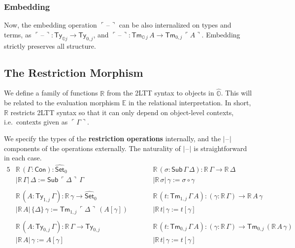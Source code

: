 \documentclass[acmsmall]{acmart}
\newcommand{\msf}[1]{\mathsf{#1}}
\newcommand{\mbb}[1]{\mathbb{#1}}
\newcommand{\wh}[1]{\widehat{#1}}
\newcommand{\mbbo}{\mbb{O}}
\newcommand{\Con}{\msf{Con}}
\newcommand{\Sub}{\msf{Sub}}
\newcommand{\Ty}{\msf{Ty}}
\newcommand{\Tm}{\msf{Tm}}
\newcommand{\Set}{\mathsf{Set}}
\newcommand{\blank}{{\mathord{\hspace{1pt}\text{--}\hspace{1pt}}}}
\newcommand{\emb}[1]{\ulcorner#1\urcorner}
\newcommand{\hato}{\bm\hat{\mbbo}}
\newcommand{\ev}{\mbb{E}}
\newcommand{\re}{\mbb{R}}
\theoremstyle{remark}
\newcommand{\whset}{\wh{\Set}}
\begin{document}
\subsubsection{Embedding}
Now, the embedding operation $\emb{\blank}$ can be also internalized on types
and terms, as $\emb{\blank} : \Ty_{\mbbo j} \to \Ty_{0,j}$, and $\emb{\blank}
:\Tm_{\mbbo\,j}\,A \to \Tm_{0,j}\,\emb{A}$. Embedding strictly preserves all structure.

\subsection{The Restriction Morphism}

We define a family of functions $\re$ from the 2LTT syntax to objects in
$\hato$. This will be related to the evaluation morphism $\ev$ in the relational
interpretation. In short, $\re$ restricts 2LTT syntax so that it can only depend
on object-level contexts, i.e.\ contexts given as $\emb{\Gamma}$.

\begin{definition} We specify the types of the \textbf{restriction operations} internally, and the $|\blank|$
components of the operations externally. The naturality of $|\blank|$ is
straightforward in each case.
\begingroup
\begin{alignat*}{5}
  & \re\,(\Gamma : \Con) : \whset_0 && \re\,(\sigma : \Sub\,\Gamma\,\Delta) : \re\,\Gamma \to \re\,\Delta \\
  & |\re\,\Gamma|\,\Delta := \Sub\,\emb{\Delta}\,\Gamma && |\re\,\sigma|\,\gamma := \sigma \circ \gamma \\
  & \\
  & \re\,(A : \Ty_{1,j}\,\Gamma) : \re\,\gamma \to \whset_0 && \re\,(t : \Tm_{1,j}\,\Gamma\,A) : (\gamma : \re\,\Gamma) \to \re\,A\,\gamma \\
  & |\re\,A|\,\{\Delta\}\,\gamma := \Tm_{1,j}\,\emb{\Delta}\,(A[\gamma])\hspace{2em} && |\re\,t|\,\gamma := t[\gamma]\\
  & \\
  & \re\,(A : \Ty_{0,j}\,\Gamma) : \re\,\Gamma \to \Ty_{0,j}\hspace{2em} && \re\,(t : \Tm_{0,j}\,\Gamma\,A) : (\gamma : \re\,\Gamma) \to \Tm_{0,j}\,(\re\,A\,\gamma)\\
  & |\re\,A|\,\gamma := A[\gamma] && |\re\,t|\,\gamma := t[\gamma]
\end{alignat*}
\endgroup
\end{definition}
\end{document}
